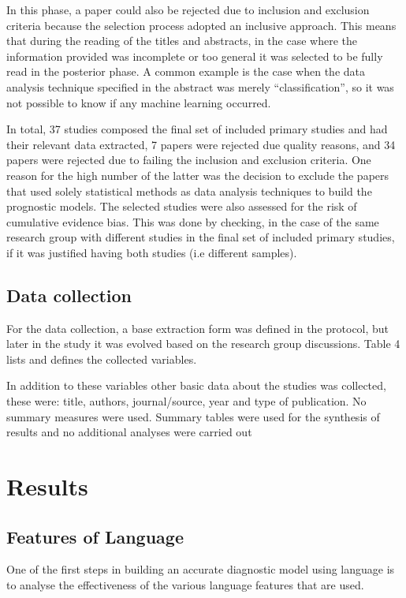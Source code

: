In this phase, a paper could also be rejected due to inclusion and exclusion criteria because the selection process adopted an inclusive approach. This means that during the reading of the titles and abstracts, in the case where the information provided was incomplete or too general it was selected to be fully read in the posterior phase. A common example is the case when the data analysis technique specified in the abstract was merely “classification”, so it was not possible to know if any machine learning occurred.
\par
In total, 37 studies composed the final set of included primary studies and had their relevant data extracted, 7 papers were rejected due quality reasons, and 34 papers were rejected due to failing the inclusion and exclusion criteria. One reason for the high number of the latter was the decision to exclude the papers that used solely statistical methods as data analysis techniques to build the prognostic models. The selected studies were also assessed for the risk of cumulative evidence bias. This was done by checking, in the case of the same research group with different studies in the final set of included primary studies, if it was justified having both studies (i.e different samples).

\subsection{Data collection}
For the data collection, a base extraction form was defined in the protocol, but later in the study it was evolved based on the research group discussions. Table 4 lists and defines the collected variables.


In addition to these variables other basic data about the studies was collected, these were: title, authors, journal/source, year and type of publication. No summary measures were used. Summary tables were used for the synthesis of results and no additional analyses were carried out

\section{Results}\label{results}
\subsection{Features of Language}
One of the first steps in building an accurate diagnostic model using language is to analyse the effectiveness of the various language features that are used.

